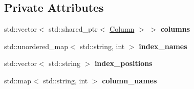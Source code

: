 \subsection*{Private Attributes}
\begin{DoxyCompactItemize}
\item 
\mbox{\label{classDataFrame_a9c466c6766286ba229148f45e3a8eb87}} 
std\+::vector$<$ std\+::shared\+\_\+ptr$<$ \hyperlink{classColumn}{Column} $>$ $>$ {\bfseries columns}
\item 
\mbox{\label{classDataFrame_ab3877a4d016a2a835a649e82b4e3b2be}} 
std\+::unordered\+\_\+map$<$ std\+::string, int $>$ {\bfseries index\+\_\+names}
\item 
\mbox{\label{classDataFrame_abfc7eae69ff9b9e260a186200507e4d6}} 
std\+::vector$<$ std\+::string $>$ {\bfseries index\+\_\+positions}
\item 
\mbox{\label{classDataFrame_ae655c8a49567c2acd61bd2f05276779a}} 
std\+::map$<$ std\+::string, int $>$ {\bfseries column\+\_\+names}
\end{DoxyCompactItemize}
